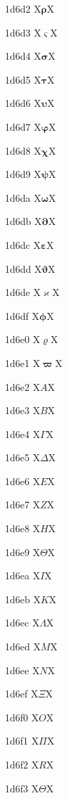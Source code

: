 \documentclass[11pt]{article}
\begin{document}
1d6d2 X{\ensuremath{\mathbf{\rho}}}X

1d6d3 X{\ensuremath{\mathbf{\varsigma}}}X

1d6d4 X{\ensuremath{\mathbf{\sigma}}}X

1d6d5 X{\ensuremath{\mathbf{\tau}}}X

1d6d6 X{\ensuremath{\mathbf{\upsilon}}}X

1d6d7 X{\ensuremath{\mathbf{\varphi}}}X

1d6d8 X{\ensuremath{\mathbf{\chi}}}X

1d6d9 X{\ensuremath{\mathbf{\psi}}}X

1d6da X{\ensuremath{\mathbf{\omega}}}X

1d6db X{\ensuremath{\mathbf{\partial}}}X

1d6dc X{\ensuremath{\mathbf{\varepsilon}}}X

1d6dd X{\ensuremath{\mathbf{\vartheta}}}X

1d6de X{\ensuremath{\mathbf{\varkappa}}}X

1d6df X{\ensuremath{\mathbf{\phi}}}X

1d6e0 X{\ensuremath{\mathbf{\varrho}}}X

1d6e1 X{\ensuremath{\mathbf{\varpi}}}X

1d6e2 X{\ensuremath{\mathit{A}}}X

1d6e3 X{\ensuremath{\mathit{B}}}X

1d6e4 X{\ensuremath{\mathit{\Gamma}}}X

1d6e5 X{\ensuremath{\mathit{\Delta}}}X

1d6e6 X{\ensuremath{\mathit{E}}}X

1d6e7 X{\ensuremath{\mathit{Z}}}X

1d6e8 X{\ensuremath{\mathit{H}}}X

1d6e9 X{\ensuremath{\mathit{\Theta}}}X

1d6ea X{\ensuremath{\mathit{I}}}X

1d6eb X{\ensuremath{\mathit{K}}}X

1d6ec X{\ensuremath{\mathit{\Lambda}}}X

1d6ed X{\ensuremath{\mathit{M}}}X

1d6ee X{\ensuremath{\mathit{N}}}X

1d6ef X{\ensuremath{\mathit{\Xi}}}X

1d6f0 X{\ensuremath{\mathit{O}}}X

1d6f1 X{\ensuremath{\mathit{\Pi}}}X

1d6f2 X{\ensuremath{\mathit{R}}}X

1d6f3 X{\ensuremath{\mathit{\varTheta}}}X
\end{document}
